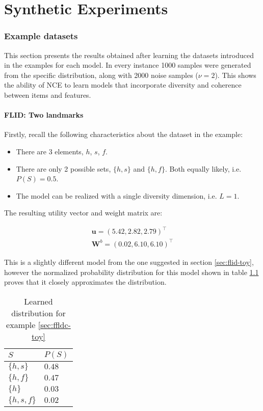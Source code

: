 \chapter{Synthetic Experiments}
\label{sec:synthetic}

\subsection{Example datasets}

This section presents the results obtained after learning the datasets introduced in the examples for each model. In every instance 1000 samples were generated from the specific distribution, along with 2000 noise samples ($\nu = 2$). This shows the ability of NCE to learn models that incorporate diversity and coherence between items and features.

\subsubsection{FLID: Two landmarks}

Firstly, recall the following characteristics about the dataset in the example:

\begin{itemize}
  \item There are 3 elements, $h$, $s$, $f$.
  \item There are only 2 possible sets, $\{h,s\}$ and $\{h,f\}$. Both equally likely, i.e. $P(S) = 0.5$.
  \item The model can be realized with a single diversity dimension, i.e. $L=1$.
\end{itemize}

The resulting utility vector and weight matrix are:

\begin{align*}
  \mathbf{u} = \left(5.42,2.82,2.79\right)^{\intercal} \\
  \mathbf{W}^{b} = \left(0.02, 6.10, 6.10\right)^{\intercal}
\end{align*}

This is a slightly different model from the one suggested in section \ref{sec:flid-toy}, however the normalized probability distribution for this model shown in table \ref{tab:flid-toy-learned-probs} proves that it closely approximates the distribution.

\begin{table}
  \centering
  \caption{Learned distribution for example \ref{sec:ffldc-toy}}
  \begin{tabular}{@{}ll@{}}
    \toprule
    $S$ & $P(S)$\\
    \midrule
    $\{h,s\}$ & $0.48$ \\
    $\{h,f\}$ & $0.47$ \\
    $\{h\}$ & $0.03$ \\
    $\{h,s,f\}$ & $0.02$ \\
    \bottomrule
  \end{tabular}
  \label{tab:flid-toy-learned-probs}
\end{table}

